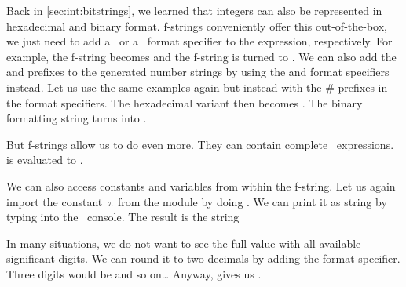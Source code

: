 %
\begin{sloppypar}%
Back in \cref{sec:int:bitstrings}, we learned that integers can also be represented in hexadecimal and binary format.
f-strings conveniently offer this out-of-the-box, we just need to add a~ or a~ format specifier to the expression, respectively.
For example, the f-string  becomes  and the f-string  is turned to .
We can also add the  and  prefixes to the generated number strings by using the  and  format specifiers instead.
Let us use the same examples again but instead with the \#-prefixes in the format specifiers.
The hexadecimal variant  then becomes .
The binary formatting string  turns into .%
\end{sloppypar}%
%
\begin{sloppypar}%
But f-strings allow us to do even more.
They can contain complete \python\ expressions.
 is evaluated to .%
\end{sloppypar}%
%
\begin{sloppypar}%
We can also access constants and variables from within the f-string.
Let us again import the constant~$\pi$ from the  module by doing .
We can print it as string by typing  into the \python\ console.
The result is the string %
\end{sloppypar}%
%
\begin{sloppypar}%
In many situations, we do not want to see the full  value with all available significant digits.
We can round it to two decimals by adding the  format specifier.
Three digits would be  and so on{\dots}
Anyway,  gives us .%
\end{sloppypar}%
